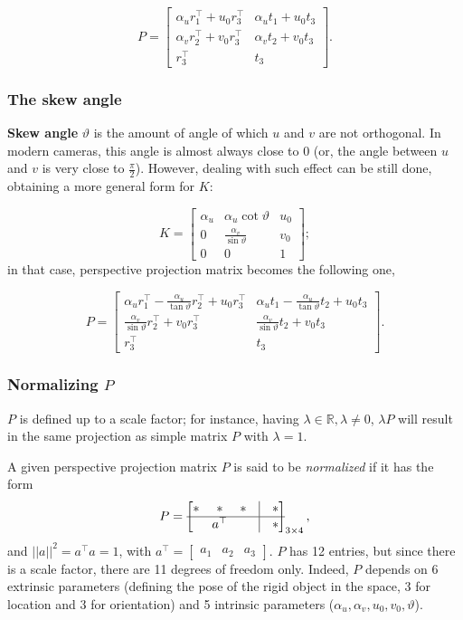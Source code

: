 \documentclass[10pt]{report}
\begin{document}
\[P = \begin{bmatrix} \alpha_u r_1^\top + u_0 r_3^\top & \alpha_u t_1 + u_0 t_3 \\ \alpha_v r_2^\top + v_0 r_3^\top & \alpha_v t_2 + v_0 t_3 \\ r_3^\top & t_3 \end{bmatrix}.\]

\subsubsection{The skew angle}
\label{the-skew-angle}
\textbf{Skew angle} \(\vartheta\) is the amount of angle of which \(u\) and
\(v\) are not orthogonal. In modern cameras, this angle is almost always
close to \(0\) (or, the angle between \(u\) and \(v\) is very close to \(\frac \pi 2\)). However, dealing with such effect can be still done, obtaining a more general form for \(K\):

\[K = \begin{bmatrix} \alpha_u & \alpha_u \cot{\vartheta} & u_0 \\ 0 & \frac{\alpha_v}{\sin\vartheta} & v_0 \\ 0 & 0 & 1\end{bmatrix};\]
in that case, perspective projection matrix becomes the following one,

\[P = \begin{bmatrix} \alpha_u r_1^\top - \frac{\alpha_u}{\tan\vartheta}r_2^\top + u_0 r_3^\top & \alpha_u t_1 - \frac{\alpha_u}{\tan\vartheta}t_2 + u_0 t_3 \\ \frac{\alpha_v}{\sin\vartheta} r_2^\top + v_0 r_3^\top & \frac{\alpha_v}{\sin\vartheta} t_2 + v_0 t_3 \\ r_3^\top & t_3 \end{bmatrix}.\]

\subsubsection{Normalizing \(P\)}
\label{normalizing-p}
\(P\) is defined up to a scale factor; for instance, having
\(\lambda \in \mathbb{R}, \lambda \neq 0\), \(\lambda P\) will result in
the same projection as simple matrix \(P\) with \(\lambda = 1\).

A given perspective projection matrix \(P\) is said to be \emph{normalized}
if it has the form
\[ P = \begin{bmatrix} * & * & * &  \vline &  * \\ \hline &  a^\top & & \vline & * \end{bmatrix}_{3 \times 4},\] and
\(||a||^2 = a^\top a = 1\), with \(a^\top = \begin{bmatrix} a_1 & a_2 & a_3\end{bmatrix}\). \(P\) has 12 entries, but since there is a
scale factor, there are 11 degrees of freedom only. Indeed, \(P\)
depends on 6 extrinsic parameters (defining the pose of the rigid object
in the space, 3 for location and 3 for orientation) and 5 intrinsic
parameters (\(\alpha_u, \alpha_v, u_0, v_0, \vartheta\)).
\end{document}
